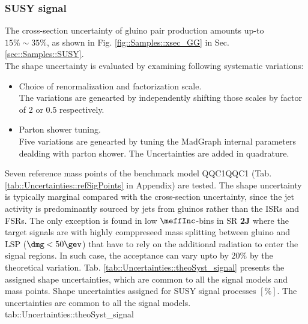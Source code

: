 


\clearpage
\subsubsection{SUSY signal} 
The cross-section uncertainty of gluino pair production amounts up-to $15\% \sim 35\%$, as shown in Fig. \ref{fig::Samples::xsec_GG} in Sec. \ref{sec::Samples::SUSY}.\\
The shape uncertainty is evaluated by examining following systematic variations:
\begin{itemize}
\item Choice of renormalization and factorization scale.\\
The variations are genearted by independently shifting those scales by factor of 2 or 0.5 respectively. 

\item Parton shower tuning.\\
Five variations are genearted by tuning the MadGraph internal parameters dealding with parton shower. The Uncertainties are added in quadrature.
\end{itemize}
Seven reference mass points of the benchmark model QQC1QQC1 (Tab. \ref{tab::Uncertainties::refSigPoints} in Appendix) are tested. 
The shape uncertainty is typically marginal compared with the cross-section uncertainty, since the jet activity is predominantly sourced by jets from gluinos rather than the ISRs and FSRs. 
The only exception is found in low $\meffInc$-bins in SR \textbf{2J} where the target signals are with highly comppreseed mass splitting between gluino and LSP ($\dmg < 50\gev$) that have to rely on the additional radiation to enter the signal regions. In such case, the acceptance can vary upto by $20\%$ by the theoretical variation. Tab. \ref{tab::Uncertainties::theoSyst_signal} presents the assigned shape uncertainties, which are common to all the signal models and mass points.
{Shape uncertainties assigned for SUSY signal processes $[\%]$. The uncertainties are common to all the signal models.}
{tab::Uncertainties::theoSyst_signal}


